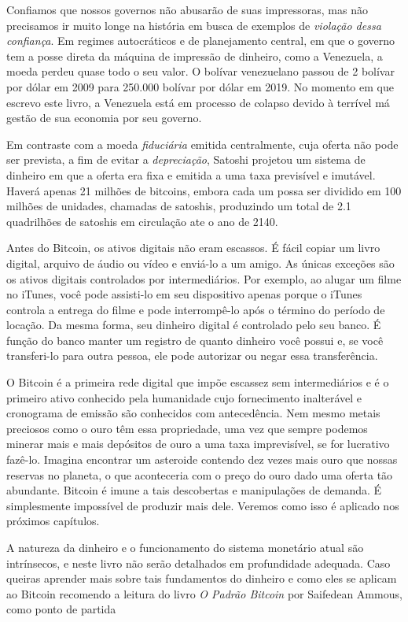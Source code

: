 Confiamos que nossos governos não abusarão de suas impressoras, mas não precisamos ir muito longe na história em busca de exemplos de \textit{violação dessa confiança}. Em regimes autocráticos e de planejamento central, em que o governo tem a posse direta da máquina de impressão de dinheiro, como a Venezuela, a moeda perdeu quase todo o seu valor. O bolívar venezuelano passou de 2 bolívar por dólar em 2009 para 250.000 bolívar por dólar em 2019. No momento em que escrevo este livro, a Venezuela está em processo de colapso devido à terrível má gestão de sua economia por seu governo.

Em contraste com a moeda \textit{fiduciária} emitida centralmente, cuja oferta não pode ser prevista, a fim de evitar a \textit{depreciação}, Satoshi projetou um sistema de dinheiro em que a oferta era fixa e emitida a uma taxa previsível e imutável. Haverá apenas 21 milhões de bitcoins, embora cada um possa ser dividido em 100 milhões de unidades, chamadas de satoshis, produzindo um total de 2.1 quadrilhões de satoshis em circulação ate o ano de 2140.

Antes do Bitcoin, os ativos digitais não eram escassos. É fácil copiar um livro digital, arquivo de áudio ou vídeo e enviá-lo a um amigo. As únicas exceções são os ativos digitais controlados por intermediários. Por exemplo, ao alugar um filme no iTunes, você pode assisti-lo em seu dispositivo apenas porque o iTunes controla a entrega do filme e pode interrompê-lo após o término do período de locação. Da mesma forma, seu dinheiro digital é controlado pelo seu banco. É função do banco manter um registro de quanto dinheiro você possui e, se você transferi-lo para outra pessoa, ele pode autorizar ou negar essa transferência.

O Bitcoin é a primeira rede digital que impõe escassez sem intermediários e é o primeiro ativo conhecido pela humanidade cujo fornecimento inalterável e cronograma de emissão são conhecidos com antecedência. Nem mesmo metais preciosos como o ouro têm essa propriedade, uma vez que sempre podemos minerar mais e mais depósitos de ouro a uma taxa imprevisível, se for lucrativo fazê-lo. 
Imagina encontrar um asteroide contendo dez vezes mais ouro que nossas reservas no planeta, o que aconteceria com o preço do ouro dado uma oferta tão abundante.
Bitcoin é imune a tais descobertas e manipulações de demanda. É simplesmente impossível de produzir mais dele.
Veremos como isso é aplicado nos próximos capítulos.

A natureza da dinheiro e o funcionamento do sistema monetário atual são intrínsecos, e neste livro não serão detalhados em profundidade adequada. Caso queiras aprender mais sobre tais fundamentos do dinheiro e como eles se aplicam ao Bitcoin recomendo a leitura do livro \textit{O Padrão Bitcoin} por Saifedean Ammous, como ponto de partida

